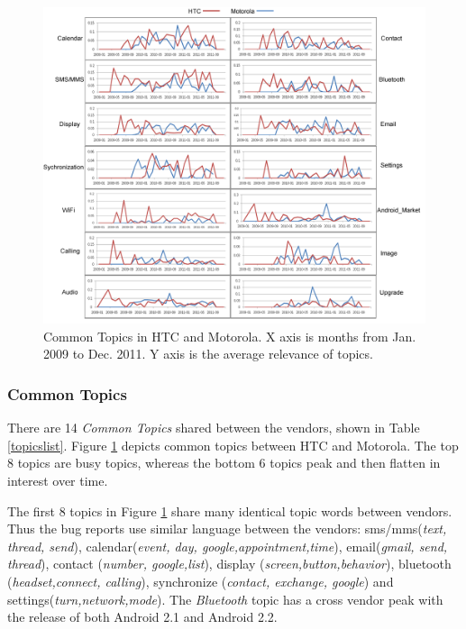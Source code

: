\documentclass[10pt, conference, compsocconf]{IEEEtran}
\begin{document}
\begin{figure}
\centering
\includegraphics[width=1\textwidth]{combinedcommon.png}
\caption{Common Topics in HTC and Motorola. X axis is months from Jan. 2009 to Dec. 2011. Y axis is the average relevance of topics.}
\label{fixtopic}
\label{commontopic}
\end{figure}

\subsubsection{Common Topics}

There are 14 \textit{Common Topics} shared between the vendors, shown
in Table \ref{topicslist}.
Figure \ref{commontopic} depicts common topics between HTC and
Motorola. The top 8 topics are busy topics, whereas the bottom 6
topics peak and then flatten in interest over time.

The first 8 topics in Figure \ref{commontopic} share many identical
topic words between vendors.
Thus the bug reports use similar language between the vendors:
sms\//mms(\textit{text, thread, send}), calendar(\textit{event, day,
  google,appointment,time}), email(\textit{gmail, send, thread}),
contact (\textit{number, google,list}), display
(\textit{screen,button,behavior}), bluetooth (\textit{headset,connect,
  calling}), synchronize (\textit{contact, exchange, google}) and
settings(\textit{turn,network,mode}).
The \textit{Bluetooth} topic has a cross vendor peak 
with the release of both
 Android 2.1 and Android
2.2. 
\end{document}

